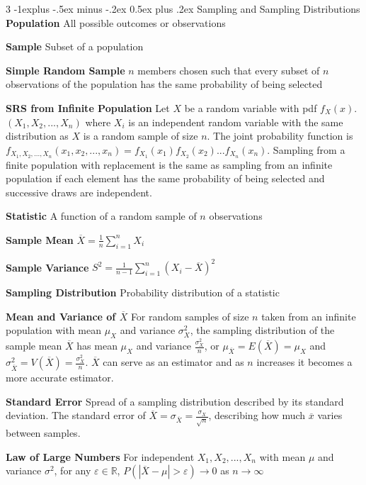 \documentclass[10pt, landscape]{article}
\makeatletter
\renewcommand{\section}{\@startsection{section}{1}{0mm}%
                                {-1ex plus -.5ex minus -.2ex}%
                                {0.5ex plus .2ex}%
                                {\normalfont\large\bfseries}}
\renewcommand{\section}{\@startsection{section}{2}{0mm}%
                                {-1explus -.5ex minus -.2ex}%
                                {0.5ex plus .2ex}%
                                {\normalfont\normalsize\bfseries}}
\makeatother
\begin{document}
\begin{multicols*}{3}
\section{Sampling and Sampling Distributions}
\textbf{Population} All possible outcomes or observations

\textbf{Sample} Subset of a population

\textbf{Simple Random Sample} $n$ members chosen such that every subset of $n$ observations of the population has the same probability of being selected

\textbf{SRS from Infinite Population} Let $X$ be a random variable with pdf $f_X(x)$. $(X_1, X_2, ..., X_n)$ where $X_i$ is an independent random variable with the same distribution as $X$ is a random sample of size $n$. The joint probability function is $f_{X_1, X_2, ..., X_n}(x_1, x_2, ..., x_n)=f_{X_1}(x_1)f_{X_2}(x_2)...f_{X_n}(x_n)$. Sampling from a finite population with replacement is the same as sampling from an infinite population if each element has the same probability of being selected and successive draws are independent.

\textbf{Statistic} A function of a random sample of $n$ observations

\textbf{Sample Mean} $\overline{X}=\frac{1}{n}\sum_{i=1}^nX_i$

\textbf{Sample Variance} $S^2=\frac{1}{n-1}\sum_{i=1}^n(X_i-\overline{X})^2$

\textbf{Sampling Distribution} Probability distribution of a statistic

\textbf{Mean and Variance of $\overline{X}$} For random samples of size $n$ taken from an infinite population with mean $\mu_X$ and variance $\sigma_X^2$, the sampling distribution of the sample mean $\overline{X}$ has mean $\mu_X$ and variance $\frac{\sigma_X^2}{n}$, or $\mu_{\overline{X}}=E(\overline{X})=\mu_X$ and $\sigma_{\overline{X}}^2=V(\overline{X})=\frac{\sigma_X^2}{n}$. $\overline{X}$ can serve as an estimator and as $n$ increases it becomes a more accurate estimator.

\textbf{Standard Error} Spread of a sampling distribution described by its standard deviation. The standard error of $\overline{X}=\sigma_{\overline{X}}=\frac{\sigma_X}{\sqrt{n}}$, describing how much $\overline{x}$ varies between samples.

\textbf{Law of Large Numbers} For independent $X_1, X_2, ..., X_n$ with mean $\mu$ and variance $\sigma^2$, for any $\varepsilon \in \mathbb{R}$, $P(|\overline{X}-\mu|>\varepsilon)\rightarrow 0$ as $n \rightarrow\infty$


\end{multicols*}
\end{document}
